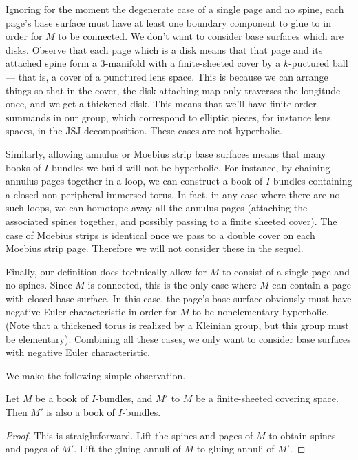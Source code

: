 Ignoring for the moment the degenerate case of a single page and no spine, each
page's base surface must have at least one boundary component to glue to in
order for $M$ to be connected. We don't want to consider base surfaces which
are disks.  Observe that each page which is a disk means that that page and its
attached spine form a 3-manifold with a finite-sheeted cover by a $k$-puctured
ball --- that is, a cover of a punctured lens space. This is because we can
arrange things so that in the cover, the disk attaching map only traverses the
longitude once, and we get a thickened disk.  This means that we'll have finite
order summands in our group, which correspond to elliptic pieces, for instance
lens spaces, in the JSJ decomposition. These cases are not hyperbolic.

Similarly, allowing annulus or Moebius strip base surfaces means that many
books of $I$-bundles we build will not be hyperbolic. For instance, by chaining
annulus pages together in a loop, we can construct a book of $I$-bundles
containing a closed non-peripheral immersed torus. In fact, in any case where
there are no such loops, we can homotope away all the annulus pages (attaching
the associated spines together, and possibly passing to a finite sheeted
cover).  The case of Moebius strips is identical once we pass to a double cover
on each Moebius strip page. Therefore we will not consider these in the sequel.

Finally, our definition does technically allow for $M$ to consist of a single
page and no spines. Since $M$ is connected, this is the only case where $M$ can
contain a page with closed base surface. In this case, the page's base surface
obviously must have negative Euler characteristic in order for $M$ to be
nonelementary hyperbolic. (Note that a thickened torus is realized by
a Kleinian group, but this group must be elementary). Combining all these
cases, we only want to consider base surfaces with negative Euler
characteristic.

We make the following simple observation.

\begin{prop}

Let $M$ be a book of $I$-bundles, and $M'$ to $M$ be a finite-sheeted covering
space.  Then $M'$ is also a book of $I$-bundles.

\end{prop}

\begin{proof}

This is straightforward. Lift the spines and pages of $M$ to obtain spines and
pages of $M'$. Lift the gluing annuli of $M$ to gluing annuli of $M'$.

\end{proof}

